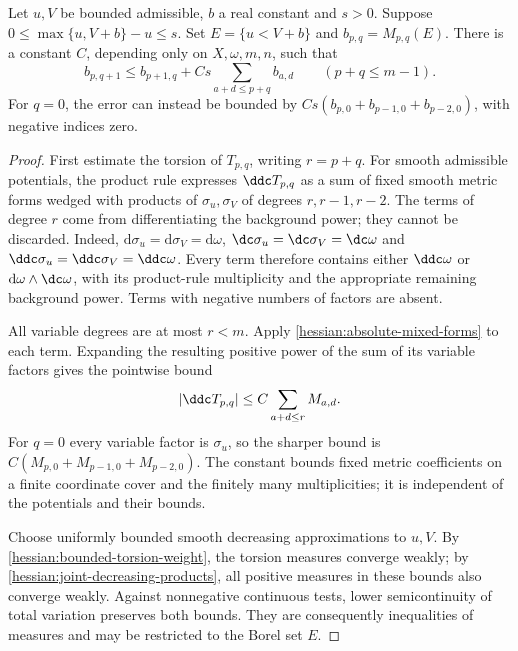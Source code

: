 \begin{lemma}\label{draft637:mixed-comparison}
Let $u,V$ be bounded admissible, $b$ a real constant and $s>0$.
Suppose $0\leq\max\{u,V+b\}-u\leq s$. Set
$E=\{u<V+b\}$ and $b_{p,q}=M_{p,q}(E)$.
There is a constant $C$, depending only on $X,\omega,m,n$, such that
\[
 b_{p,q+1}\leq b_{p+1,q}
              +Cs\sum_{a+d\leq p+q}b_{a,d}
                   \qquad(p+q\leq m-1).
\]
For $q=0$, the error can instead be bounded by
$Cs(b_{p,0}+b_{p-1,0}+b_{p-2,0})$, with negative indices zero.
\end{lemma}
\begin{proof}
First estimate the torsion of $T_{p,q}$, writing $r=p+q$.
For smooth admissible potentials, the product rule expresses
$\ddc T_{p,q}$ as a sum of fixed smooth metric forms wedged
with products of $\sigma_u,\sigma_V$ of degrees $r,r-1,r-2$.
The terms of degree $r$ come from differentiating the background
power; they cannot be discarded. Indeed,
$\mathrm d\sigma_u=\mathrm d\sigma_V=\mathrm d\omega$,
$\dc\sigma_u=\dc\sigma_V=\dc\omega$ and
$\ddc\sigma_u=\ddc\sigma_V=\ddc\omega$.
Every term therefore contains either $\ddc\omega$ or
$\mathrm d\omega\wedge\dc\omega$, with its product-rule
multiplicity and the appropriate remaining background power.
Terms with negative numbers of factors are absent.

All variable degrees are at most $r<m$.
Apply \cref{hessian:absolute-mixed-forms} to each term. Expanding
the resulting positive power of the sum of its variable factors
gives the pointwise bound
\[
 |\ddc T_{p,q}|\leq C\sum_{a+d\leq r}M_{a,d}.
\]
For $q=0$ every variable factor is $\sigma_u$, so the sharper
bound is $C(M_{p,0}+M_{p-1,0}+M_{p-2,0})$.
The constant bounds fixed metric coefficients on a finite coordinate
cover and the finitely many multiplicities; it is independent of
the potentials and their bounds.

Choose uniformly bounded smooth decreasing approximations to $u,V$.
By \cref{hessian:bounded-torsion-weight}, the torsion measures
converge weakly; by \cref{hessian:joint-decreasing-products},
all positive measures in these bounds also converge weakly.
Against nonnegative continuous tests, lower semicontinuity of
total variation preserves both bounds. They are consequently
inequalities of measures and may be restricted to the Borel set $E$.


\end{proof}
